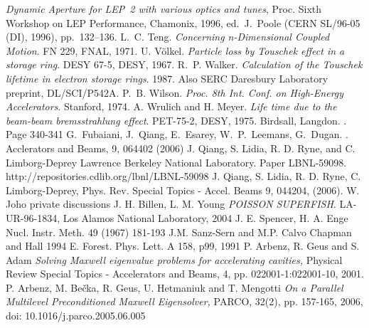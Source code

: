 \begin{thebibliography}{10}
{\sl Dynamic Aperture for LEP~2 with various optics and tunes}, 
Proc. Sixth Workshop on LEP Performance, Chamonix, 1996, ed.~J.~Poole (CERN SL/96-05 (DI), 1996), pp.~132--136.
L.~C. Teng.
{\sl Concerning n-Dimensional Coupled Motion}.
FN 229, FNAL, 1971.
U. V\"olkel.
{\sl Particle loss by Touschek effect in a storage ring}.
DESY 67-5, DESY, 1967.
R.~P. Walker.
{\sl Calculation of the Touschek lifetime in electron storage rings}.
1987.
Also SERC Daresbury Laboratory preprint, DL/SCI/P542A.
P.~B. Wilson.
{\sl Proc. 8th Int. Conf. on High-Energy Accelerators}.
Stanford, 1974.
A. Wrulich and H. Meyer.
{\sl Life time due to the beam-beam bremsstrahlung effect}.
PET-75-2, DESY, 1975.
Birdsall, Langdon.
.
\newblock Page 340-341
G.\ Fubaiani, J.\ Qiang, E.\ Esarey, W.\ P.\ Leemans, G.\ Dugan.
.
\newblock Acclerators and Beams, 9, 064402 (2006) 
J. Qiang, S. Lidia, R. D. Ryne, and C. Limborg-Deprey
\newblock Lawrence Berkeley National Laboratory. Paper LBNL-59098. http://repositories.cdlib.org/lbnl/LBNL-59098
J. Qiang, S. Lidia, R. D. Ryne, C. Limborg-Deprey, 
\newblock Phys. Rev. Special Topics - Accel. Beams 9, 044204, (2006).
W. Joho
\newblock private discussions
J. H. Billen, L. M. Young
{\sl POISSON SUPERFISH}.
LA-UR-96-1834, Los Alamos National Laboratory, 2004
J. E. Spencer,  H. A. Enge
\newblock Nucl. Instr. Meth. 49 (1967) 181-193
J.M. Sanz-Sern and M.P. Calvo
Chapman and Hall 1994
E. Forest. Phys. Lett. A 158, p99, 1991
P. Arbenz, R. Geus and S. Adam
{\sl Solving Maxwell eigenvalue problems for accelerating cavities,}
Physical Review Special Topics - Accelerators and Beams,
4, pp. 022001-1:022001-10, 2001.
P. Arbenz, M. Be\v{c}ka, R. Geus, U. Hetmaniuk and T. Mengotti
{\sl On a Parallel Multilevel Preconditioned Maxwell Eigensolver,}
PARCO, 32(2), pp. 157-165, 2006, doi: 10.1016/j.parco.2005.06.005

\end{thebibliography}
